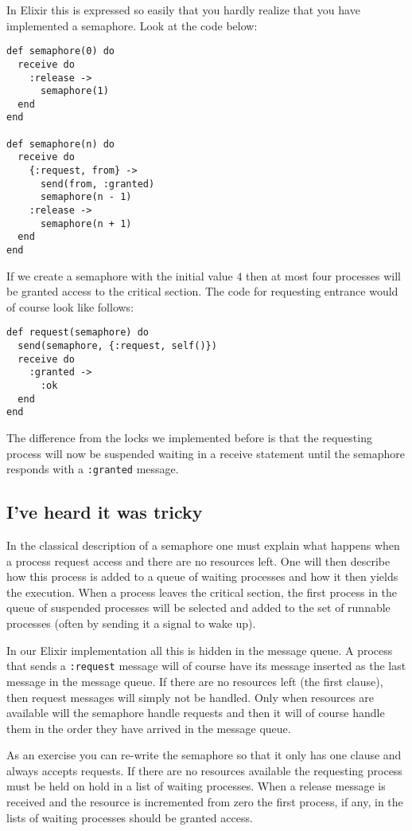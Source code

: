 \documentclass[a4paper,11pt]{article}
\begin{document}
In Elixir this is expressed so easily that you hardly realize that you
have implemented a semaphore. Look at the code below:

\begin{verbatim}
def semaphore(0) do
  receive do
    :release ->
      semaphore(1)
  end
end

def semaphore(n) do
  receive do
    {:request, from} ->
      send(from, :granted)
      semaphore(n - 1)
    :release ->
      semaphore(n + 1)
  end
end
\end{verbatim}

If we create a semaphore with the initial value $4$
then at most four processes will be granted access to the critical
section. The code for requesting entrance would of course look like follows:

\begin{verbatim}
def request(semaphore) do
  send(semaphore, {:request, self()})
  receive do
    :granted ->
      :ok
  end
end
\end{verbatim}

The difference from the locks we implemented before is that the
requesting process will now be suspended waiting in a receive
statement until the semaphore responds with a {\tt :granted} message.


\subsection{I've heard it was tricky}

In the classical description of a semaphore one must explain what
happens when a process request access and there are no resources
left. One will then describe how this process is added to a queue of
waiting processes and how it then yields the execution. When a process
leaves the critical section, the first process in the queue of
suspended processes will be selected and added to the set of runnable
processes (often by sending it a signal to wake up).

In our Elixir implementation all this is hidden in the message
queue. A process that sends a {\tt :request} message will of course
have its message inserted as the last message in the message queue. If
there are no resources left (the first clause), then request messages
will simply not be handled. Only when resources are available will the
semaphore handle requests and then it will of course handle them in the
order they have arrived in the message queue.

As an exercise you can re-write the semaphore so that it only has one
clause and always accepts requests. If there are no resources
available the requesting process must be held on hold in a list of
waiting processes. When a release message is received and the resource
is incremented from zero the first process, if any, in the lists of
waiting processes should be granted access. 
\end{document}
